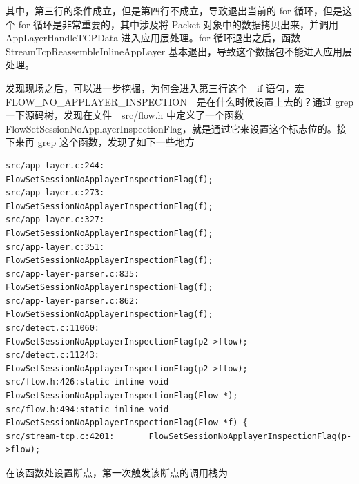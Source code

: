 其中，第三行的条件成立，但是第四行不成立，导致退出当前的 {\cf for} 循环，但是这个 {\cf for} 循环是非常重要的，其中涉及将 {\cf Packet} 对象中的数据拷贝出来，并调用 {\cf AppLayerHandleTCPData} 进入应用层处理。{\cf for} 循环退出之后，函数 {\cf StreamTcpReassembleInlineAppLayer} 基本退出，导致这个数据包不能进入应用层处理。

发现现场之后，可以进一步挖掘，为何会进入第三行这个　{\cf if} 语句，宏 {\cf FLOW\_NO\_APPLAYER\_INSPECTION}　是在什么时候设置上去的？通过 {\cmdf grep} 一下源码树，发现在文件　{\ff src/flow.h} 中定义了一个函数 {\cf FlowSetSessionNoApplayerInspectionFlag}，就是通过它来设置这个标志位的。接下来再 {\cmdf grep} 这个函数，发现了如下一些地方

\begin{lstlisting}
src/app-layer.c:244:         FlowSetSessionNoApplayerInspectionFlag(f);
src/app-layer.c:273:         FlowSetSessionNoApplayerInspectionFlag(f);
src/app-layer.c:327:         FlowSetSessionNoApplayerInspectionFlag(f);
src/app-layer.c:351:         FlowSetSessionNoApplayerInspectionFlag(f);
src/app-layer-parser.c:835:  FlowSetSessionNoApplayerInspectionFlag(f);
src/app-layer-parser.c:862:  FlowSetSessionNoApplayerInspectionFlag(f);
src/detect.c:11060:          FlowSetSessionNoApplayerInspectionFlag(p2->flow);
src/detect.c:11243:          FlowSetSessionNoApplayerInspectionFlag(p2->flow);
src/flow.h:426:static inline void FlowSetSessionNoApplayerInspectionFlag(Flow *);
src/flow.h:494:static inline void FlowSetSessionNoApplayerInspectionFlag(Flow *f) {
src/stream-tcp.c:4201:       FlowSetSessionNoApplayerInspectionFlag(p->flow);
\end{lstlisting}


在该函数处设置断点，第一次触发该断点的调用栈为

